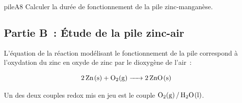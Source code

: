 \begin{questionmult}{pileA8}
    Calculer la durée de fonctionnement de la pile zinc-manganèse.\\
    \begin{EnvQuadrillage}[NbCarreaux=19x3,Grille=Seyes,Marge=1]
    \end{EnvQuadrillage}
\end{questionmult}

\subsection{Partie B~: Étude de la pile zinc-air}
L'équation de la réaction modélisant le fonctionnement de la pile correspond à l'oxydation du zinc en oxyde de zinc par le dioxygène de l'air~:

$$
\ce{2 Zn(s) + O2(g) -> 2 ZnO(s)}
$$

Un des deux couples redox mis en jeu est le couple $\ce{O2(g) / H2O(l)}$.

